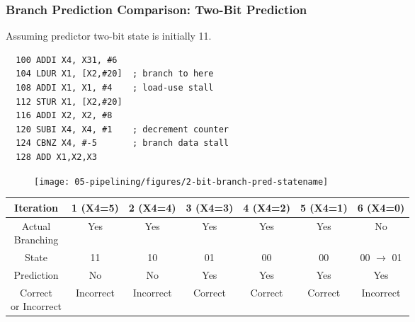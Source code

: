 \begin{frame}[fragile]\frametitle{Branch Prediction Comparison: Two-Bit Prediction}
Assuming predictor two-bit state is initially 11.
\begin{multicols}{2}
{\tiny
\begin{verbatim}
  100 ADDI X4, X31, #6
  104 LDUR X1, [X2,#20]  ; branch to here
  108 ADDI X1, X1, #4    ; load-use stall
  112 STUR X1, [X2,#20]
  116 ADDI X2, X2, #8
  120 SUBI X4, X4, #1    ; decrement counter
  124 CBNZ X4, #-5       ; branch data stall
  128 ADD X1,X2,X3       
\end{verbatim}
}
\columnbreak
\begin{figure}[H]
\centering
	{\texttt{[image: 05-pipelining/figures/2-bit-branch-pred-statename]}}
\end{figure}    
\end{multicols}
{\footnotesize
\begin{center}
	\begin{tabular}{c|cccccc}
Iteration &  1 (X4=5) & 2 (X4=4) & 3 (X4=3) & 4 (X4=2) & 5 (X4=1) & 6 (X4=0) \\\hline
\makecell{Actual\\Branching} & Yes & Yes & Yes & Yes & Yes & No \\ \hline
State & 11 & 10 & 01 & 00 & 00 & 00 {$\rightarrow$ 01}\\ \hline
Prediction & No & No & Yes & Yes & Yes & Yes \\ \hline
\makecell{Correct \\or Incorrect} & Incorrect & Incorrect & Correct & Correct & Correct & Incorrect \\ \hline
\end{tabular}
\end{center}
}
\end{frame}

